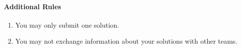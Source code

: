 \documentclass[
    a4paper,
    12pt,
    parskip=half,
    headings=standardclasses,
    footskip=0pt,
    footlines=1,
    headheight=80in
]{scrartcl}
\begin{document}
\paragraph*{Additional Rules}
\begin{enumerate}
    \item You may only submit one solution.
    \item You may not exchange information about your solutions with other teams.
\end{enumerate}
\end{document}

